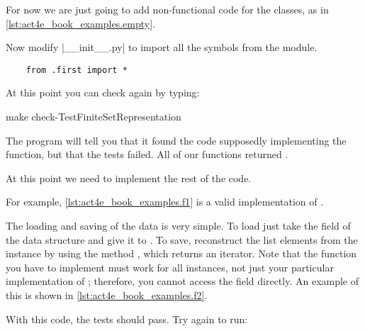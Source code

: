 For now we are just going to add non-functional code for the classes,
as in \cref{lst:act4e_book_examples.empty}.

\begin{longcode}
	\caption{}

	\label{lst:act4e_book_examples.empty}
\end{longcode}

Now modify \files|__init__.py| to import all the symbols from the  module.

\begin{verbatim}
    from .first import *
\end{verbatim}

At this point you can check again by typing:

\begin{console}
	make check-TestFiniteSetRepresentation
\end{console}

The program will tell you that it found the code supposedly implementing the function,
but that the tests failed.
All of our functions returned .

At this point we need to implement the rest of the code.

For example, \cref{lst:act4e_book_examples.f1} is a valid implementation of \FiniteSet.

\begin{longcode}
	\caption{}
	\label{lst:act4e_book_examples.f1}
\end{longcode}

The loading and saving of the data is very simple.
To load just take the  field of the data structure and give it to .
To save, reconstruct the list elements from the  instance by using the method , which returns an iterator.
Note that the  function you have to implement must work for all \FiniteSet instances, not just your particular implementation of \FiniteSet; therefore, you cannot access the  field directly.
An example of this is shown in \cref{lst:act4e_book_examples.f2}.

\begin{longcode}
	\caption{}
	\label{lst:act4e_book_examples.f2}
\end{longcode}

With this code, the tests should pass.
Try again to run:

